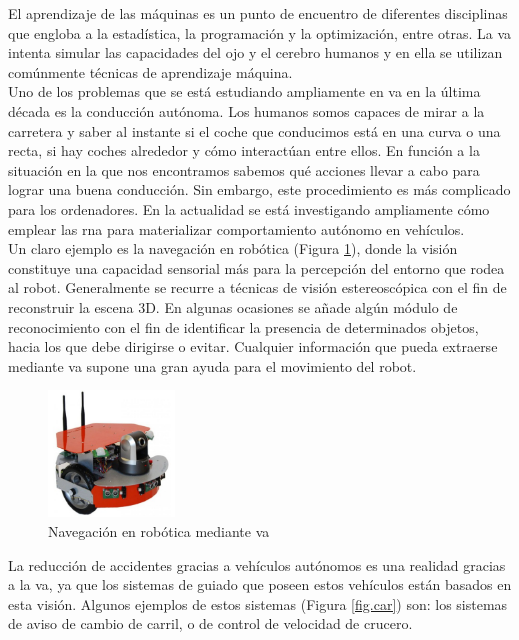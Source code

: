 El aprendizaje de las máquinas es un punto de encuentro de diferentes disciplinas que engloba a la estadística, la programación y la optimización, entre otras. La \acrshort{va} intenta simular las capacidades del ojo y el cerebro humanos y en ella se utilizan comúnmente técnicas de aprendizaje máquina.\\

Uno de los problemas que se está estudiando ampliamente en \acrshort{va} en la última década es la conducción autónoma. Los humanos somos capaces de mirar a la carretera y saber al instante si el coche que conducimos está en una curva o una recta, si hay coches alrededor y cómo interactúan entre ellos. En función a la situación en la que nos encontramos sabemos qué acciones llevar a cabo para lograr una buena conducción.  Sin embargo, este procedimiento es más complicado para los ordenadores. En la actualidad se está investigando ampliamente cómo emplear las \acrfull{rna} para materializar comportamiento autónomo en vehículos.\\

Un claro ejemplo es la navegación en robótica (Figura \ref{fig.robot}), donde la visión constituye una capacidad sensorial más para la percepción del entorno que rodea al robot. Generalmente se recurre a técnicas de visión estereoscópica con el fin de reconstruir la escena 3D. En algunas ocasiones se añade algún módulo de reconocimiento con el fin de identificar la presencia de determinados objetos, hacia los que debe dirigirse o evitar. Cualquier información que pueda extraerse mediante \acrshort{va} supone una gran ayuda para el movimiento del robot. \\

\begin{figure}[H]
  \begin{center}
    \includegraphics[width=0.3\textwidth]{figures/introduccion/robot.jpg}
		\caption{Navegación en robótica mediante \acrshort{va}}
		\label{fig.robot}
		\end{center}
\end{figure}

La reducción de accidentes gracias a vehículos autónomos es una realidad gracias a la \acrshort{va}, ya que los sistemas de guiado que poseen estos vehículos están basados en esta visión. Algunos ejemplos de estos sistemas (Figura \ref{fig.car}) son: los sistemas de aviso de cambio de carril, o de control de velocidad de crucero. 

